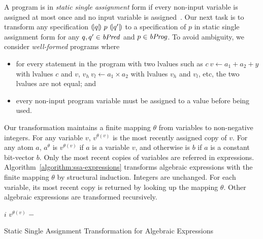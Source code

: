 
A program is in \emph{static single assignment} form if every non-input variable
is assigned at most once and no input variable is assigned~\cite{AWZ:88:DQVP}.
Our next task is to transform any specification
${(\!|}{q}{|\!)}~{p}~{(\!|}{q'}{|\!)}$ to a specification of $p$ in
static single  assignment form for any $q, q' \in \mathit{bPred}$ and $p \in
\mathit{bProg}$.
To avoid ambiguity, we consider \emph{well-formed} programs where
\begin{itemize}
\item for every statement in the program with two lvalues such as $c\ v \leftarrow a_1 + a_2 + y$ with lvalues $c$ and $v$, $v_h\ v_l \leftarrow a_1 \times a_2$ with lvalues $v_h$ and $v_l$, etc, the two lvalues are not equal; and
\item every non-input program variable must be assigned to a value
  before being used.
\end{itemize}

Our transformation maintains a finite mapping $\theta$ from variables to
non-negative integers. For any variable $v$, $v^{\theta(v)}$ is
the most recently assigned copy of $v$.
For any atom $a$, $a^{\theta}$ is $v^{\theta(v)}$ if $a$ is a variable $v$, and otherwise is $b$ if $a$ is a constant bit-vector $b$.
Only the most recent copies of variables are referred in
expressions. Algorithm~\ref{algorithm:ssa-expressions}
transforms algebraic expressions with the finite mapping $\theta$ by
structural induction. Integers are unchanged. For each variable, its
most recent copy is returned by looking up the mapping $\theta$. Other
algebraic expressions are transformed recursively.

\begin{algorithm}
  \begin{algorithmic}[1]
       \Return $i$ \EndCase
       \Return $v^{\theta(v)}$ \EndCase
       \Return $-$ \EndCase
      \EndCase
      \EndCase
      \EndCase
    \EndMatch
    \EndFunction
  \end{algorithmic}
  \caption{Static Single Assignment Transformation for Algebraic Expressions}
  \label{algorithm:ssa-expressions}
\end{algorithm}


